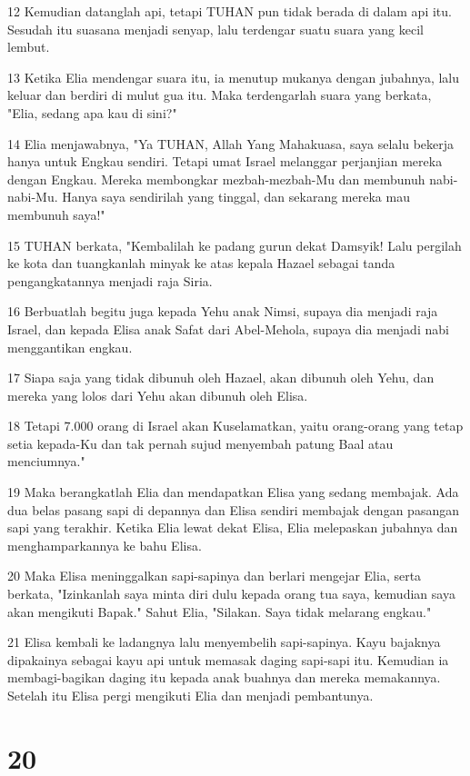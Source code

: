 \par 12 Kemudian datanglah api, tetapi TUHAN pun tidak berada di dalam api itu. Sesudah itu suasana menjadi senyap, lalu terdengar suatu suara yang kecil lembut.
\par 13 Ketika Elia mendengar suara itu, ia menutup mukanya dengan jubahnya, lalu keluar dan berdiri di mulut gua itu. Maka terdengarlah suara yang berkata, "Elia, sedang apa kau di sini?"
\par 14 Elia menjawabnya, "Ya TUHAN, Allah Yang Mahakuasa, saya selalu bekerja hanya untuk Engkau sendiri. Tetapi umat Israel melanggar perjanjian mereka dengan Engkau. Mereka membongkar mezbah-mezbah-Mu dan membunuh nabi-nabi-Mu. Hanya saya sendirilah yang tinggal, dan sekarang mereka mau membunuh saya!"
\par 15 TUHAN berkata, "Kembalilah ke padang gurun dekat Damsyik! Lalu pergilah ke kota dan tuangkanlah minyak ke atas kepala Hazael sebagai tanda pengangkatannya menjadi raja Siria.
\par 16 Berbuatlah begitu juga kepada Yehu anak Nimsi, supaya dia menjadi raja Israel, dan kepada Elisa anak Safat dari Abel-Mehola, supaya dia menjadi nabi menggantikan engkau.
\par 17 Siapa saja yang tidak dibunuh oleh Hazael, akan dibunuh oleh Yehu, dan mereka yang lolos dari Yehu akan dibunuh oleh Elisa.
\par 18 Tetapi 7.000 orang di Israel akan Kuselamatkan, yaitu orang-orang yang tetap setia kepada-Ku dan tak pernah sujud menyembah patung Baal atau menciumnya."
\par 19 Maka berangkatlah Elia dan mendapatkan Elisa yang sedang membajak. Ada dua belas pasang sapi di depannya dan Elisa sendiri membajak dengan pasangan sapi yang terakhir. Ketika Elia lewat dekat Elisa, Elia melepaskan jubahnya dan menghamparkannya ke bahu Elisa.
\par 20 Maka Elisa meninggalkan sapi-sapinya dan berlari mengejar Elia, serta berkata, "Izinkanlah saya minta diri dulu kepada orang tua saya, kemudian saya akan mengikuti Bapak." Sahut Elia, "Silakan. Saya tidak melarang engkau."
\par 21 Elisa kembali ke ladangnya lalu menyembelih sapi-sapinya. Kayu bajaknya dipakainya sebagai kayu api untuk memasak daging sapi-sapi itu. Kemudian ia membagi-bagikan daging itu kepada anak buahnya dan mereka memakannya. Setelah itu Elisa pergi mengikuti Elia dan menjadi pembantunya.

\chapter{20}

